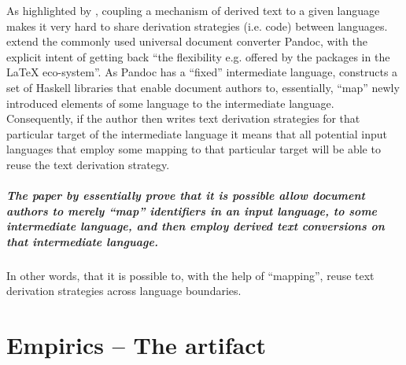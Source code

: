 \documentclass{scrreprt}
\begin{document}
As highlighted by \citet{krijnen}, coupling a mechanism of derived text to a given language makes it very hard to share derivation strategies (i.e. code) between languages.  \citet{krijnen} extend the commonly used universal document converter Pandoc\footnotePandoc{}, with the explicit intent of getting back ``the flexibility e.g. offered by the packages in the \LaTeX{} eco-system''. As Pandoc\footnotePandoc{} has a ``fixed'' intermediate language, \citet{krijnen} constructs a set of Haskell libraries that enable document authors to, essentially, ``map'' newly introduced elements of some language to the intermediate language. Consequently, if the author then writes text derivation strategies for that particular target of the intermediate language it means that all potential input languages that employ some mapping to that particular target will be able to reuse the text derivation strategy.

\paragraph{The paper by \citet{krijnen} essentially prove that it is possible allow document authors to merely ``map'' identifiers in an input language, to some intermediate language, and then employ derived text conversions on that intermediate language.} In other words, that it is possible to, with the help of ``mapping'', reuse text derivation strategies across language boundaries.

























%
%
%
%
%
%


\chapter{Empirics -- The artifact}



%
%
\end{document}
